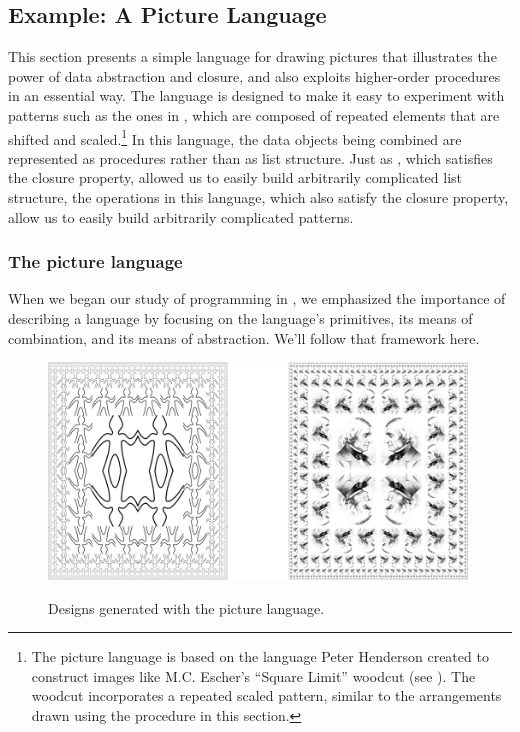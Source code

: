 \subsection{Example: A Picture Language}
\label{Section 2.2.4}

This section presents a simple language for drawing pictures that illustrates
the power of data abstraction and closure, and also exploits higher-order
procedures in an essential way.  The language is designed to make it easy to
experiment with patterns such as the ones in , which are
composed of repeated elements that are shifted and scaled.\footnote{The picture
language is based on the language Peter Henderson created to construct images
like M.C. Escher's ``Square Limit'' woodcut (see ).  The woodcut
incorporates a repeated scaled pattern, similar to the arrangements drawn using
the  procedure in this section.} In this language, the data
objects being combined are represented as procedures rather than as list
structure.  Just as , which satisfies the closure property, allowed
us to easily build arbitrarily complicated list structure, the operations in
this language, which also satisfy the closure property, allow us to easily
build arbitrarily complicated patterns.


\subsubsection*{The picture language}

When we began our study of programming in , we emphasized the
importance of describing a language by focusing on the language's primitives,
its means of combination, and its means of abstraction.  We'll follow that
framework here.

\begin{figure}[tb]
\label{Figure 2.9}
\centering

\includegraphics[width=111mm]{fig/chap2/Fig2.9-bigger.png}
\par\bigskip
\noindent
{} Designs generated with the picture language.
\end{figure}

